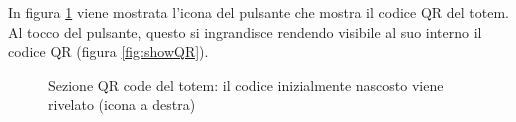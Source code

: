In figura \ref{fig:depositIconsQR} viene mostrata l'icona del pulsante che mostra il codice QR del totem. Al tocco del pulsante, questo si ingrandisce rendendo visibile al suo interno il codice QR (figura \ref{fig:showQR}).
\begin{figure}
    \centering
    \vspace{1cm}
    \caption[Sezione QR code del totem]{Sezione QR code del totem: il codice inizialmente nascosto viene rivelato (icona a destra)}
    \label{fig:depositIconsQR}
\end{figure}

